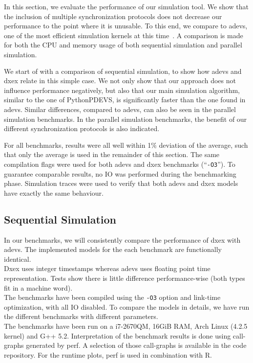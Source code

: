 In this section, we evaluate the performance of our simulation tool.
We show that the inclusion of multiple synchronization protocols does not decrease our performance to the point where it is unusable.
To this end, we compare to adevs, one of the most efficient simulation kernels at this time~\cite{DEVSSurvey}.
A comparison is made for both the CPU and memory usage of both sequential simulation and parallel simulation.

We start of with a comparison of sequential simulation, to show how adevs and dxex relate in this simple case.
We not only show that our approach does not influence performance negatively, but also that our main simulation algorithm, similar to the one of PythonPDEVS, is significantly faster than the one found in adevs.
Similar differences, compared to adevs, can also be seen in the parallel simulation benchmarks.
In the parallel simulation benchmarks, the benefit of our different synchronization protocols is also indicated.

For all benchmarks, results were all well within 1\% deviation of the average, such that only the average is used in the remainder of this section.
The same compilation flags were used for both adevs and dxex benchmarks (``\texttt{-O3}'').
To guarantee comparable results, no IO was performed during the benchmarking phase.
Simulation traces were used to verify that both adevs and dxex models have exactly the same behaviour.

\subsection{Sequential Simulation}
In our benchmarks, we will consistently compare the performance of dxex with adevs. The implemented models for the each benchmark are functionally identical.\\
Dxex uses integer timestamps whereas adevs uses floating point time representation. Tests show there is little difference performance-wise (both types fit in a machine word).\\
The benchmarks have been compiled using the {\tt -O3} option and link-time optimization, with all IO disabled. To compare the models in details, we have run the different benchmarks with different parameters.\\
The benchmarks have been run on a i7-2670QM, 16GiB RAM, Arch Linux (4.2.5 kernel) and G++ 5.2. Interpretation of the benchmark results is done using call-graphs generated by perf. A selection of those call-graphs is available in the code repository. For the runtime plots, perf is used in combination with R.\\
